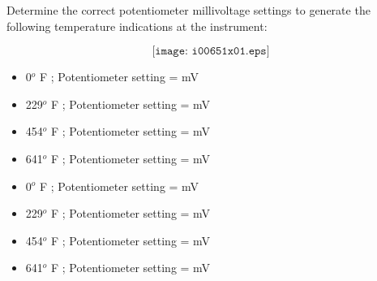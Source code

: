 

Determine the correct potentiometer millivoltage settings to generate the following temperature indications at the instrument:

$$\texttt{[image: i00651x01.eps]}$$

\begin{itemize}
\item{} 0$^{o}$ F ; Potentiometer setting = \underbar{\hskip 50pt} mV 
\vskip 5pt
\item{} 229$^{o}$ F ; Potentiometer setting = \underbar{\hskip 50pt} mV 
\vskip 5pt
\item{} 454$^{o}$ F ; Potentiometer setting = \underbar{\hskip 50pt} mV  
\vskip 5pt
\item{} 641$^{o}$ F ; Potentiometer setting = \underbar{\hskip 50pt} mV  
\end{itemize}







\begin{itemize}
\item{} 0$^{o}$ F ; Potentiometer setting =  mV 
\item{} 229$^{o}$ F ; Potentiometer setting =  mV 
\item{} 454$^{o}$ F ; Potentiometer setting =  mV  
\item{} 641$^{o}$ F ; Potentiometer setting =  mV  
\end{itemize}











